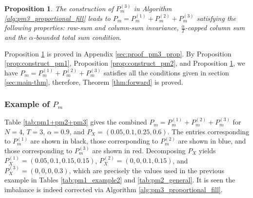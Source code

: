\documentclass[11pt,letterpaper]{article}
\newtheorem{prop}{\textbf{Proposition}}
\begin{document}
\begin{prop} \label{prop:pm3_contruction}
    The construction of $P_m^{(3)}$ in Algorithm \ref{alg:pm3_proportional_fill} leads to $P_m = P_m^{(1)} + P_m^{(2)} + P_m^{(3)}$ satisfying the following properties: row-sum and column-sum invariance, $\tfrac{\alpha}{T}$-capped column sum and the $\alpha$-bounded total sum condition.
\end{prop}
Proposition \ref{prop:pm3_contruction} is proved in Appendix \ref{sec:proof_pm3_prop}. By Proposition \ref{prop:construct_pm1}, Proposition \ref{prop:construct_pm2}, and Proposition \ref{prop:pm3_contruction}, we have $P_m = P_m^{(1)} + P_m^{(2)} + P_m^{(3)}$ satisfies all the conditions given in section \ref{sec:main-thm}, therefore, Theorem \ref{thm:forward} is proved.

\subsubsection{Example of $P_m$ }
Table \ref{tab:pm1+pm2+pm3} gives the combined \(P_m = P_m^{(1)} + P_m^{(2)} + P_m^{(3)}\) for \(N = 4\), \(T = 3\), \(\alpha = 0.9\), and \(P_X = (0.05, 0.1, 0.25, 0.6)\). The entries corresponding to \(P_m^{(1)}\) are shown in black, those corresponding to \(P_m^{(2)}\) are shown in blue, and those corresponding to \(P_m^{(3)}\) are shown in red. Decomposing \(P_X\) yields \(P_X^{(1)} = (0.05, 0.1, 0.15, 0.15)\), \(P_X^{(2)} = (0, 0, 0.1, 0.15)\), and \(P_X^{(3)} = (0, 0, 0, 0.3)\), which are precisely the values used in the previous example in Tables \ref{tab:pm1_example2} and \ref{tab:pm2_general}. 
It is seen the imbalance is indeed corrected via Algorithm \ref{alg:pm3_proportional_fill}.
\end{document}
